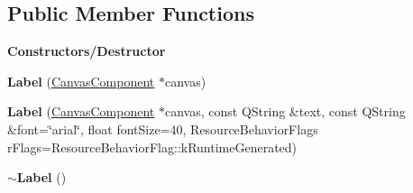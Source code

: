 \subsection*{Public Member Functions}
\begin{Indent}\textbf{ Constructors/\+Destructor}\par
\begin{DoxyCompactItemize}
\item 
\mbox{\label{classrev_1_1_label_a5c762da81162fbefc4395e04a03ec3e9}} 
{\bfseries Label} (\mbox{\hyperlink{classrev_1_1_canvas_component}{Canvas\+Component}} $\ast$canvas)
\item 
\mbox{\label{classrev_1_1_label_a370385f5d1b1a4972c58f38db95c773f}} 
{\bfseries Label} (\mbox{\hyperlink{classrev_1_1_canvas_component}{Canvas\+Component}} $\ast$canvas, const Q\+String \&text, const Q\+String \&font=\char`\"{}arial\char`\"{}, float font\+Size=40, Resource\+Behavior\+Flags r\+Flags=Resource\+Behavior\+Flag\+::k\+Runtime\+Generated)
\item 
\mbox{\label{classrev_1_1_label_a3341f11a0f7139289f096667fc1c198b}} 
{\bfseries $\sim$\+Label} ()
\end{DoxyCompactItemize}
\end{Indent}
